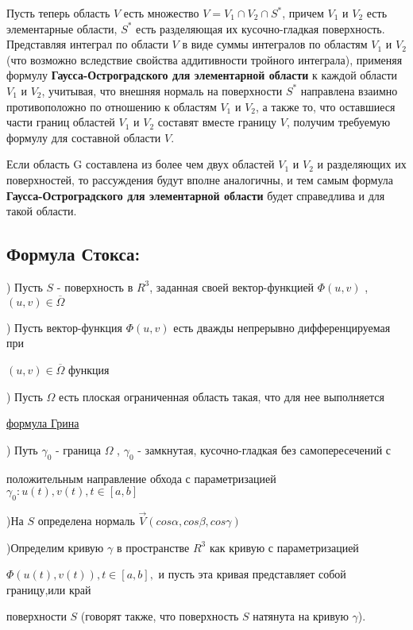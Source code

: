 \documentclass[12pt, english]{article}
\begin{document}
	Пусть теперь область $V$ есть множество $V = V_1 \cap V_2 \cap S^* $, причем $V_1$
и $V_2$ есть элементарные области, $S^* $ есть разделяющая их кусочно-гладкая
поверхность. Представляя интеграл по области $V$ в виде суммы интегралов по областям $V_1$ и $V_2$ (что возможно вследствие свойства аддитивности
тройного интеграла), применяя формулу \textbf{Гаусса-Остроградского для элементарной области} к каждой области $V_1$ и $V_2$,
учитывая, что внешняя нормаль на поверхности $S^* $ направлена взаимно
противоположно по отношению к областям $V_1$ и $V_2$, а также то, что оставшиеся части границ областей $V_1$ и $V_2$ составят вместе границу $V$, получим
требуемую формулу  для составной области $V$.

	Если область G составлена из более чем двух областей
$V_1$ и $V_2$ и разделяющих их поверхностей, то рассуждения будут вполне
аналогичны, и тем самым формула \textbf{Гаусса-Остроградского для элементарной области} будет справедлива и для такой
области.


\newpage
\subsection{Формула Стокса:}

) Пусть $S$ - поверхность в $R^3$, заданная своей вектор-функцией $\Phi(u,v)$ , $(u,v) \in \overline{\Omega}$

) Пусть вектор-функция $\Phi(u,v)$ есть дважды непрерывно дифференцируемая при \par $(u,v) \in \overline{\Omega}$ функция
	
) Пусть $\Omega$ есть плоская ограниченная область такая, что для нее выполняется \par \hyperref[eq3]{формула Грина}

) Путь $\gamma_0$ - граница $\Omega$ , $\gamma_0$ - замкнутая, кусочно-гладкая без самопересечений с \par положительным направление обхода с параметризацией  $\gamma_0 : u(t) , v(t) , t \in [a,b]$

)На $S$ определена нормаль $\vec{V}(cos\alpha , cos\beta , cos\gamma)$

)Определим кривую $\gamma$ в пространстве $R^3$ как кривую с параметризацией \par $\Phi(u(t) , v(t)) , t \in [a,b], $ и пусть эта кривая представляет собой границу,или край \par поверхности $S$ (говорят также, что поверхность $S$ натянута
на кривую $\gamma$).
\end{document}
